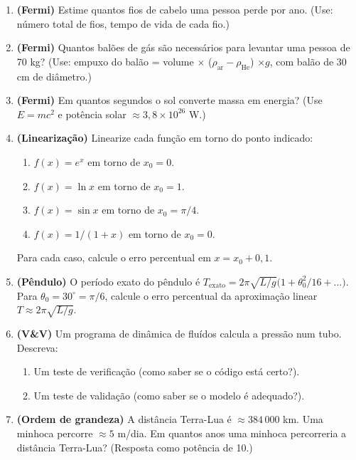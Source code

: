 \documentclass[12pt,a4paper]{article}
\begin{document}
\begin{enumerate}
  \item \textbf{(Fermi)} Estime quantos fios de cabelo uma pessoa perde por ano. (Use: n\'umero total de fios, tempo de vida de cada fio.)
  
  \item \textbf{(Fermi)} Quantos bal\~oes de g\'as s\~ao necess\'arios para levantar uma pessoa de 70 kg? (Use: empuxo do bal\~ao = volume $\times$ ($\rho_\text{ar} - \rho_\text{He}$) $\times g$, com bal\~ao de 30 cm de di\^ametro.)
  
  \item \textbf{(Fermi)} Em quantos segundos o sol converte massa em energia? (Use $E = mc^2$ e pot\^encia solar $\approx 3{,}8 \times 10^{26}$ W.)
  
  \item \textbf{(Lineariza\c{c}\~ao)} Linearize cada fun\c{c}\~ao em torno do ponto indicado:
    \begin{enumerate}
      \item[$a.$] $f(x) = e^x$ em torno de $x_0 = 0$.
      \item[$b.$] $f(x) = \ln x$ em torno de $x_0 = 1$.
      \item[$c.$] $f(x) = \sin x$ em torno de $x_0 = \pi/4$.
      \item[$d.$] $f(x) = 1/(1+x)$ em torno de $x_0 = 0$.
    \end{enumerate}
    Para cada caso, calcule o erro percentual em $x=x_0 + 0{,}1$.
  
  \item \textbf{(P\^endulo)} O per\'iodo exato do p\^endulo \'e $T_\text{exato} = 2\pi\sqrt{L/g}\big(1 + \theta_0^2/16 + \ldots\big)$. Para $\theta_0 = 30^\circ = \pi/6$, calcule o erro percentual da aproxima\c{c}\~ao linear $T \approx 2\pi\sqrt{L/g}$.
  
  \item \textbf{(V\&V)} Um programa de din\^amica de flu\'idos calcula a press\~ao num tubo. Descreva:
    \begin{enumerate}
      \item[$a.$] Um teste de verifica\c{c}\~ao (como saber se o c\'odigo est\'a certo?).
      \item[$b.$] Um teste de valida\c{c}\~ao (como saber se o modelo \'e adequado?).
    \end{enumerate}
  
  \item \textbf{(Ordem de grandeza)} A dist\^ancia Terra-Lua \'e $\approx 384\,000$ km. Uma minhoca percorre $\approx 5$ m/dia. Em quantos anos uma minhoca percorreria a dist\^ancia Terra-Lua? (Resposta como pot\^encia de 10.)
\end{enumerate}
\end{document}

